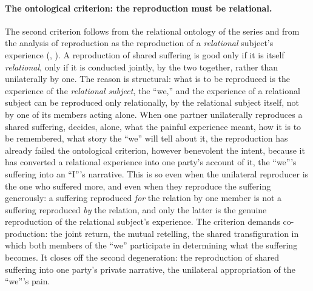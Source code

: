 \paragraph{The ontological criterion: the reproduction must be relational.}
The second criterion follows from the relational ontology of the series and from the analysis of reproduction as the reproduction of a \emph{relational} subject's experience (, ). A reproduction of shared suffering is good only if it is itself \emph{relational}, only if it is conducted jointly, by the two together, rather than unilaterally by one. The reason is structural: what is to be reproduced is the experience of the \emph{relational subject}, the ``we,'' and the experience of a relational subject can be reproduced only relationally, by the relational subject itself, not by one of its members acting alone. When one partner unilaterally reproduces a shared suffering, decides, alone, what the painful experience meant, how it is to be remembered, what story the ``we'' will tell about it, the reproduction has already failed the ontological criterion, however benevolent the intent, because it has converted a relational experience into one party's account of it, the ``we'''s suffering into an ``I'''s narrative. This is so even when the unilateral reproducer is the one who suffered more, and even when they reproduce the suffering generously: a suffering reproduced \emph{for} the relation by one member is not a suffering reproduced \emph{by} the relation, and only the latter is the genuine reproduction of the relational subject's experience. The criterion demands co-production: the joint return, the mutual retelling, the shared transfiguration in which both members of the ``we'' participate in determining what the suffering becomes. It closes off the second degeneration: the reproduction of shared suffering into one party's private narrative, the unilateral appropriation of the ``we'''s pain.

